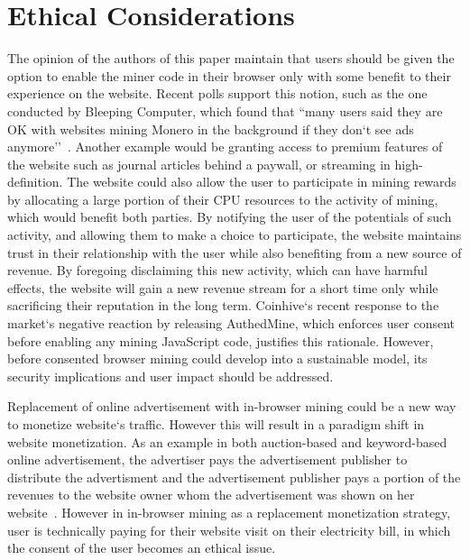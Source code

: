 
\section{Ethical Considerations}
\label{sec:ethics}

The opinion of the authors of this paper maintain that users should be given the option to enable the miner code in their browser only with some benefit to their experience on the website. Recent polls support this notion, such as the one conducted by Bleeping Computer, which found that ``many users said they are OK with websites mining Monero in the background if they don`t see ads anymore''~\cite{bleepingcomputerminers}. Another example would be granting access to premium features of the website such as journal articles behind a paywall, or streaming in high-definition. The website could also allow the user to participate in mining rewards by allocating a large portion of their CPU resources to the activity of mining, which would benefit both parties. By notifying the user of the potentials of such activity, and allowing them to make a choice to participate, the website maintains trust in their relationship with the user while also benefiting from a new source of revenue. By foregoing disclaiming this new activity, which can have harmful effects, the website will gain a new revenue stream for a short time only while sacrificing their reputation in the long term. Coinhive`s recent response to the market`s negative reaction by releasing AuthedMine, which enforces user consent before enabling any mining JavaScript code, justifies this rationale. However, before consented browser mining could develop into a sustainable model, its security implications and user impact should be addressed.

Replacement of online advertisement with in-browser mining could be a new way to monetize website`s traffic. However this will result in a paradigm shift in website monetization. As an example in both auction-based and keyword-based online advertisement, the advertiser pays the advertisement publisher to distribute the advertisment and the advertisement publisher pays a portion of the revenues to the website owner whom the advertisement was shown on her website~\cite{king2007internet}. However in in-browser mining as a replacement monetization strategy, user is technically paying for their website visit on their electricity bill, in which the consent of the user becomes an ethical issue. 

